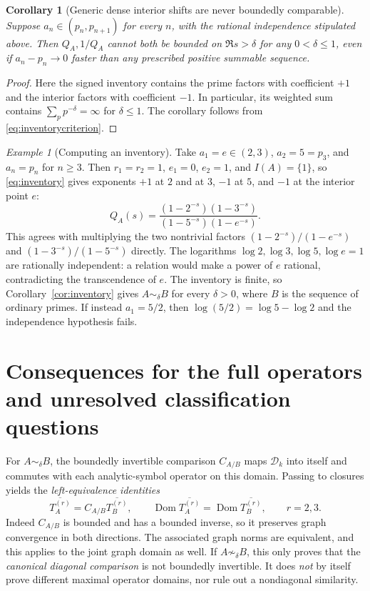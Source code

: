 \documentclass[12pt,letterpaper]{article}
\newtheorem{corollary}[theorem]{Corollary}
\numberwithin{equation}{section}
\theoremstyle{remark}
\newtheorem{example}[theorem]{Example}
\newcommand{\D}{\mathcal D}
\DeclareMathOperator{\Dom}{Dom}
\begin{document}
\begin{corollary}[Generic dense interior shifts are never boundedly comparable]\label{cor:dense}
Suppose $a_n\in(p_n,p_{n+1})$ for every $n$, with the rational independence stipulated above. Then $Q_A,1/Q_A$ cannot both be bounded on $\Re s>\delta$ for any $0<\delta\le1$, even if $a_n-p_n\to0$ faster than any prescribed positive summable sequence.
\end{corollary}
\begin{proof}
Here the signed inventory contains the prime factors with coefficient $+1$ and the interior factors with coefficient $-1$. In particular, its weighted sum contains $\sum_p p^{-\delta}=\infty$ for $\delta\le1$. The corollary follows from \eqref{eq:inventorycriterion}.
\end{proof}

\begin{example}[Computing an inventory]\label{ex:inventory}
Take $a_1=e\in(2,3)$, $a_2=5=p_3$, and $a_n=p_n$ for $n\ge3$.  Then
$r_1=r_2=1$, $e_1=0$, $e_2=1$, and $I(A)=\{1\}$, so \eqref{eq:inventory}
gives exponents $+1$ at $2$ and at $3$, $-1$ at $5$, and $-1$ at the
interior point $e$:
\[
 Q_A(s)=\frac{(1-2^{-s})(1-3^{-s})}{(1-5^{-s})(1-e^{-s})}.
\]
This agrees with multiplying the two nontrivial factors
$(1-2^{-s})/(1-e^{-s})$ and $(1-3^{-s})/(1-5^{-s})$ directly.  The
logarithms $\log2,\log3,\log5,\log e=1$ are rationally independent: a
relation would make a power of $e$ rational, contradicting the
transcendence of $e$.  The inventory is finite, so Corollary~\ref{cor:inventory}
gives $A\sim_\delta B$ for every $\delta>0$, where $B$ is the sequence of ordinary primes.  If instead $a_1=5/2$, then
$\log(5/2)=\log5-\log2$ and the independence hypothesis fails.
\end{example}

\section[Full-operator consequences]{Consequences for the full operators and unresolved classification questions}
For $A\sim_\delta B$, the boundedly invertible comparison $C_{A/B}$ maps $\D_k$ into itself and commutes with each analytic-symbol operator on this domain. Passing to closures yields the \emph{left-equivalence identities}
\begin{equation}\label{eq:lefteq}
 \overline{T_A^{(r)}}=C_{A/B}\overline{T_B^{(r)}},\qquad
 \Dom\overline{T_A^{(r)}}=\Dom\overline{T_B^{(r)}},\qquad r=2,3.
\end{equation}
Indeed $C_{A/B}$ is bounded and has a bounded inverse, so it preserves graph convergence in both directions. The associated graph norms are equivalent, and this applies to the joint graph domain as well. If $A\not\sim_\delta B$, this only proves that the \emph{canonical diagonal comparison} is not boundedly invertible. It does \emph{not} by itself prove different maximal operator domains, nor rule out a nondiagonal similarity.
\end{document}
